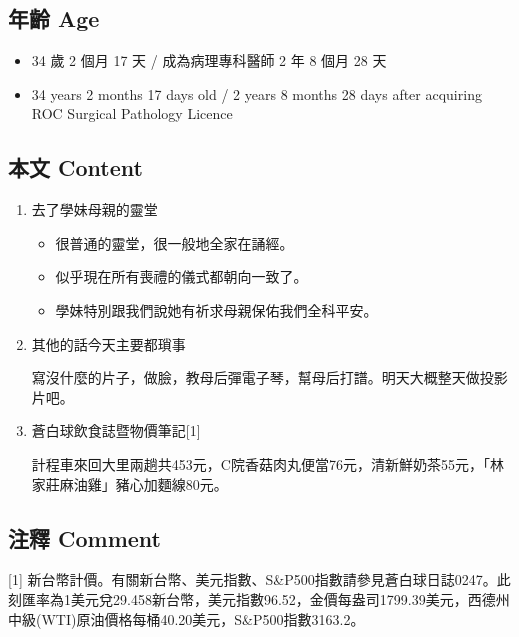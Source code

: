 \documentclass[a5paper, 11pt
]{book}
\providecommand{\tightlist}{%
  \setlength{\itemsep}{0pt}\setlength{\parskip}{0pt}}
\begin{document}
\hypertarget{ux5e74ux9f61-age-35}{%
\subsection{年齡 Age}\label{ux5e74ux9f61-age-35}}

\begin{itemize}
\tightlist
\item
  34 歲 2 個月 17 天 / 成為病理專科醫師 2 年 8 個月 28 天
\item
  34 years 2 months 17 days old / 2 years 8 months 28 days after
  acquiring ROC Surgical Pathology Licence
\end{itemize}

\hypertarget{ux672cux6587-content-35}{%
\subsection{本文 Content}\label{ux672cux6587-content-35}}

\begin{enumerate}
\def\labelenumi{\arabic{enumi}.}
\item
  去了學妹母親的靈堂

  \begin{itemize}
  \tightlist
  \item
    很普通的靈堂，很一般地全家在誦經。
  \item
    似乎現在所有喪禮的儀式都朝向一致了。
  \item
    學妹特別跟我們說她有祈求母親保佑我們全科平安。
  \end{itemize}
\item
  其他的話今天主要都瑣事

  寫沒什麼的片子，做臉，教母后彈電子琴，幫母后打譜。明天大概整天做投影片吧。
\item
  蒼白球飲食誌暨物價筆記{[}1{]}

  計程車來回大里兩趟共453元，C院香菇肉丸便當76元，清新鮮奶茶55元，「林家莊麻油雞」豬心加麵線80元。
\end{enumerate}

\hypertarget{ux6ce8ux91cb-comment-35}{%
\subsection{注釋 Comment}\label{ux6ce8ux91cb-comment-35}}

{[}1{]}
新台幣計價。有關新台幣、美元指數、S\&P500指數請參見蒼白球日誌0247。此刻匯率為1美元兌29.458新台幣，美元指數96.52，金價每盎司1799.39美元，西德州中級(WTI)原油價格每桶40.20美元，S\&P500指數3163.2。
\end{document}
